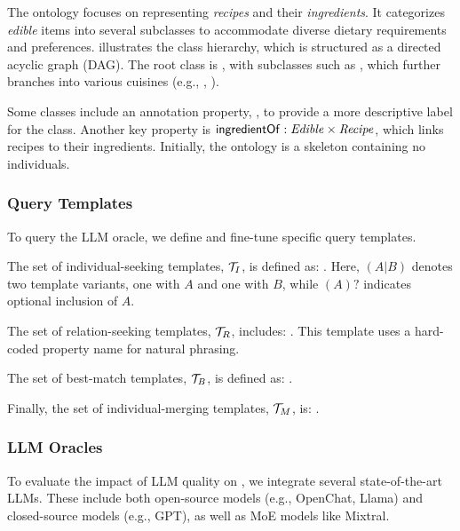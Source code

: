 %
The ontology focuses on representing \emph{recipes} and their \emph{ingredients}.
%
It categorizes \emph{edible} items into several subclasses to accommodate diverse dietary requirements and preferences.
%
 illustrates the class hierarchy, which is structured as a directed acyclic graph (DAG).
%
The root class is , with subclasses such as , which further branches into various cuisines (e.g., , ).

%
Some classes include an annotation property, , to provide a more descriptive label for the class.
%
Another key property is $\relation{ingredientOf} : \concept{Edible} \times \concept{Recipe}$, which links recipes to their ingredients.
%
Initially, the ontology is a skeleton containing no individuals.

%
\subsubsection{Query Templates}
\label{subsubsec:query-templates}
%
To query the \gls{LLM} oracle, we define and fine-tune specific query templates.

%
The set of individual-seeking templates, $\relset{T}_{I}$, is defined as:
%
.
%
Here, $(A|B)$ denotes two template variants, one with $A$ and one with $B$, while $(A)?$ indicates optional inclusion of $A$.

%
The set of relation-seeking templates, $\relset{T}_{R}$, includes:
%
.
%
This template uses a hard-coded property name for natural phrasing.

%
The set of best-match templates, $\relset{T}_{B}$, is defined as:
%
.

%
Finally, the set of individual-merging templates, $\relset{T}_{M}$, is:
%
.

%
\subsubsection{\gls{LLM} Oracles}
\label{subsubsec:llms-oracles}
%
To evaluate the impact of \gls{LLM} quality on \llmfkg{}, we integrate several state-of-the-art \glspl{LLM}.
%
These include both open-source models (e.g., OpenChat, Llama) and closed-source models (e.g., GPT), as well as \gls{MoE} models like Mixtral.

